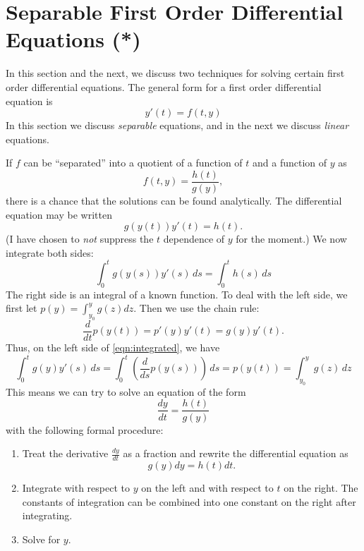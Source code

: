 \documentclass[reqno]{immbook}
\numberwithin{equation}{chapter}
\numberwithin{question}{section}
\numberwithin{theorem}{chapter}
\numberwithin{figure}{chapter}
\theoremstyle{definition}
\begin{document}
\newpage

\section{Separable First Order Differential Equations (*)}

In this section and the next, we discuss
two techniques for solving certain first order
differential equations.
The general form for a first order differential equation is
\begin{equation}
   y'(t) = f(t,y)
\end{equation}
In this section we discuss \emph{separable} equations,
and in the next we discuss \emph{linear} equations.

\medskip
If $f$ can be ``separated'' into a quotient of a function of $t$ and a function
of $y$ as
\begin{equation}
   f(t,y) = \frac{h(t)}{g(y)},
\end{equation}
there is a chance that the solutions can
be found analytically.
The differential equation may be written
\begin{equation}
  g(y(t))y'(t) = h(t).
\label{eqn:separated}
\end{equation}
(I have chosen to \emph{not} suppress the $t$ dependence of
$y$ for the moment.)
We now integrate both sides:
\begin{equation}
    \int_0^t g(y(s))y'(s) \, ds = \int_0^t h(s) \, ds
\label{eqn:integrated}
\end{equation}
The right side is an integral of a known function.
To deal with the left side, we first let $p(y) = \int_{y_0}^y g(z) dz$.
Then  we use the chain rule:
\begin{equation}
   \frac{d}{dt} p(y(t)) = p'(y)y'(t) = g(y)y'(t).
\end{equation}
Thus, on the left side of \eqref{eqn:integrated}, we have
\begin{equation}
  \int_0^t g(y)y'(s)\,ds = \int_0^t \left(\frac{d}{ds} p(y(s))\right)\, ds = p(y(t)) = 
    \int_{y_0}^y g(z) \, dz
\end{equation}
This means we can try to solve an equation of the form
\begin{equation}
   \frac{dy}{dt} = \frac{h(t)}{g(y)}
\end{equation}
with the following formal procedure:
\begin{enumerate}
\item Treat the derivative $\frac{dy}{dt}$ as a fraction and rewrite the differential equation
as
\begin{equation}
   g(y)dy = h(t)dt.
\end{equation}
\item Integrate with respect to $y$ on the left and with respect to $t$ on the right.
The constants of integration can be combined into one constant on the right after
integrating.
\item Solve for $y$.
\end{enumerate}
\end{document}
